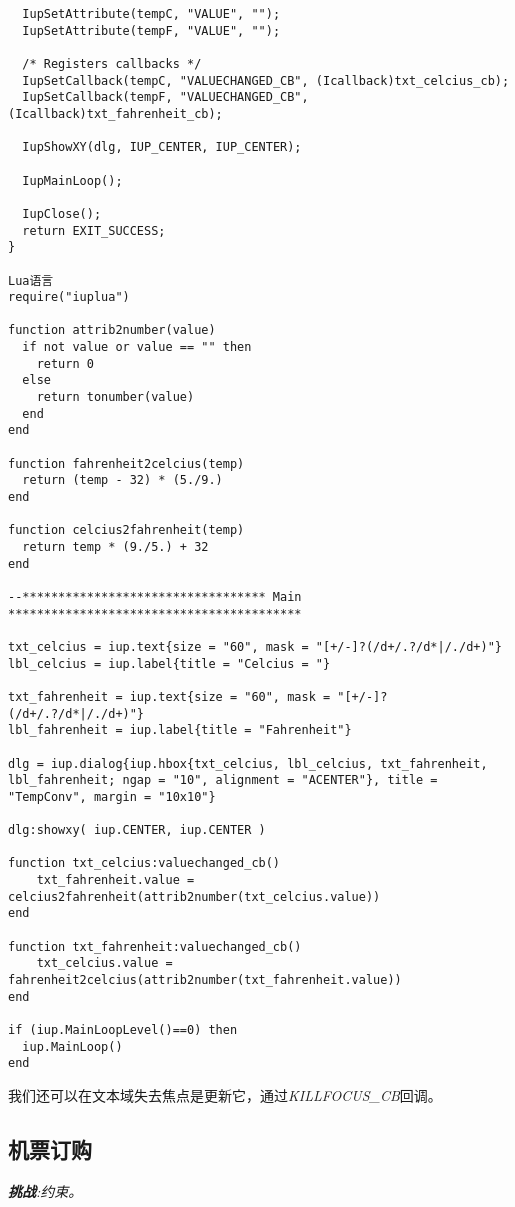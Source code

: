 \documentclass{ctexart}
\begin{document}
\begin{lstlisting}
  IupSetAttribute(tempC, "VALUE", "");
  IupSetAttribute(tempF, "VALUE", "");

  /* Registers callbacks */
  IupSetCallback(tempC, "VALUECHANGED_CB", (Icallback)txt_celcius_cb);
  IupSetCallback(tempF, "VALUECHANGED_CB", (Icallback)txt_fahrenheit_cb);

  IupShowXY(dlg, IUP_CENTER, IUP_CENTER);

  IupMainLoop();

  IupClose();
  return EXIT_SUCCESS;
}

Lua语言
require("iuplua")

function attrib2number(value)
  if not value or value == "" then
    return 0
  else
    return tonumber(value)
  end
end

function fahrenheit2celcius(temp)
  return (temp - 32) * (5./9.)
end

function celcius2fahrenheit(temp)
  return temp * (9./5.) + 32
end

--********************************** Main *****************************************

txt_celcius = iup.text{size = "60", mask = "[+/-]?(/d+/.?/d*|/./d+)"}
lbl_celcius = iup.label{title = "Celcius = "}

txt_fahrenheit = iup.text{size = "60", mask = "[+/-]?(/d+/.?/d*|/./d+)"}
lbl_fahrenheit = iup.label{title = "Fahrenheit"}

dlg = iup.dialog{iup.hbox{txt_celcius, lbl_celcius, txt_fahrenheit, lbl_fahrenheit; ngap = "10", alignment = "ACENTER"}, title = "TempConv", margin = "10x10"}

dlg:showxy( iup.CENTER, iup.CENTER )

function txt_celcius:valuechanged_cb()
	txt_fahrenheit.value = celcius2fahrenheit(attrib2number(txt_celcius.value))
end

function txt_fahrenheit:valuechanged_cb()
	txt_celcius.value = fahrenheit2celcius(attrib2number(txt_fahrenheit.value))
end

if (iup.MainLoopLevel()==0) then
  iup.MainLoop()
end
\end{lstlisting}

我们还可以在文本域失去焦点是更新它，通过\emph{KILLFOCUS\_CB}回调。

\subsection{机票订购}

\emph{\textbf{挑战}:约束。}
\end{document}

